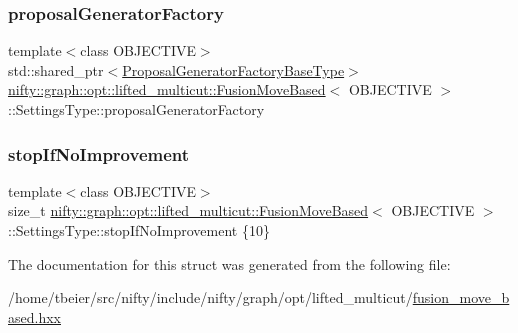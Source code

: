 \subsubsection{\texorpdfstring{proposal\+Generator\+Factory}{proposalGeneratorFactory}}
{\footnotesize\ttfamily template$<$class O\+B\+J\+E\+C\+T\+I\+VE$>$ \\
std\+::shared\+\_\+ptr$<$\hyperlink{classnifty_1_1graph_1_1opt_1_1lifted__multicut_1_1FusionMoveBased_ad32ffc33c2cf2b316bcc7231b9fba245}{Proposal\+Generator\+Factory\+Base\+Type}$>$ \hyperlink{classnifty_1_1graph_1_1opt_1_1lifted__multicut_1_1FusionMoveBased}{nifty\+::graph\+::opt\+::lifted\+\_\+multicut\+::\+Fusion\+Move\+Based}$<$ O\+B\+J\+E\+C\+T\+I\+VE $>$\+::Settings\+Type\+::proposal\+Generator\+Factory}

\mbox{\label{structnifty_1_1graph_1_1opt_1_1lifted__multicut_1_1FusionMoveBased_1_1SettingsType_ae90d5be70f54fba771ebcbdf0216d2e9}} 
\subsubsection{\texorpdfstring{stop\+If\+No\+Improvement}{stopIfNoImprovement}}
{\footnotesize\ttfamily template$<$class O\+B\+J\+E\+C\+T\+I\+VE$>$ \\
size\+\_\+t \hyperlink{classnifty_1_1graph_1_1opt_1_1lifted__multicut_1_1FusionMoveBased}{nifty\+::graph\+::opt\+::lifted\+\_\+multicut\+::\+Fusion\+Move\+Based}$<$ O\+B\+J\+E\+C\+T\+I\+VE $>$\+::Settings\+Type\+::stop\+If\+No\+Improvement \{10\}}



The documentation for this struct was generated from the following file\+:\begin{DoxyCompactItemize}
\item 
/home/tbeier/src/nifty/include/nifty/graph/opt/lifted\+\_\+multicut/\hyperlink{lifted__multicut_2fusion__move__based_8hxx}{fusion\+\_\+move\+\_\+based.\+hxx}\end{DoxyCompactItemize}
